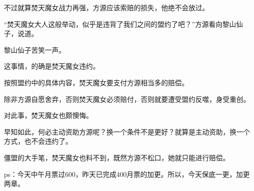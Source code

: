 \begin{this_body}
不过就算焚天魔女战力再强，方源应该索赔的损失，他绝不会放过。

“焚天魔女大人这般举动，似乎是违背了我们之间的盟约了吧？”方源看向黎山仙子，说道。

黎山仙子苦笑一声。

这事情，的确是焚天魔女违约。

按照盟约中的具体内容，焚天魔女要支付方源相当多的赔偿。

除非方源自愿舍弃，否则焚天魔女必须赔付，否则就要遭受盟约反噬，身受重创。

对此事，焚天魔女也颇懊悔。

早知如此，何必主动资助方源呢？换一个条件不是更好？就算是主动资助，换一个方式，也不会违约了。

僵盟的大手笔，焚天魔女也料不到，既然方源不松口，她就只能进行赔偿。

ps：今天中午月票过600，昨天已完成400月票的加更。所以，今天保底一更，加更两章。

\end{this_body}


